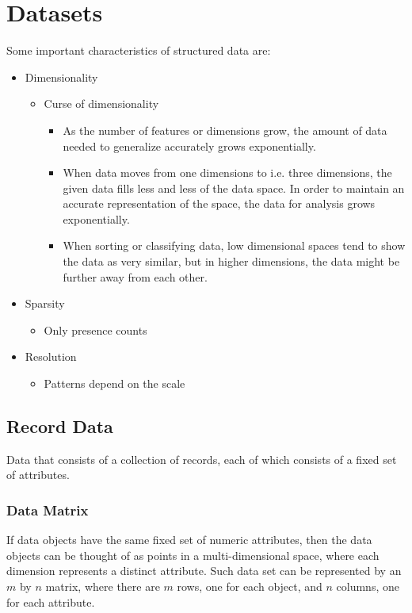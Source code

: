 \section{Datasets}
Some important characteristics of structured data are:
\begin{itemize}
    \item Dimensionality
    \begin{itemize}
        \item Curse of dimensionality
        \begin{itemize}
            \item As the number of features or dimensions grow, the amount of data needed to generalize accurately grows exponentially.
            \item When data moves from one dimensions to i.e. three dimensions, the given data fills less and less of the data space.
                  In order to maintain an accurate representation of the space, the data for analysis grows exponentially.
            \item When sorting or classifying data, low dimensional spaces tend to show the data as very similar,
                  but in higher dimensions, the data might be further away from each other.
        \end{itemize}
    \end{itemize}
    \item Sparsity
    \begin{itemize}
        \item Only presence counts
    \end{itemize}
    \item Resolution
    \begin{itemize}
        \item Patterns depend on the scale
    \end{itemize}
\end{itemize}

\subsection{Record Data}
Data that consists of a collection of records, each of which consists of a fixed set of attributes.

\subsubsection{Data Matrix}
If data objects have the same fixed set of numeric attributes, then the data objects can be thought of as points in a multi-dimensional space, where each dimension represents a distinct attribute.
Such data set can be represented by an $m$ by $n$ matrix, where there are $m$ rows, one for each object, and $n$ columns, one for each attribute.

